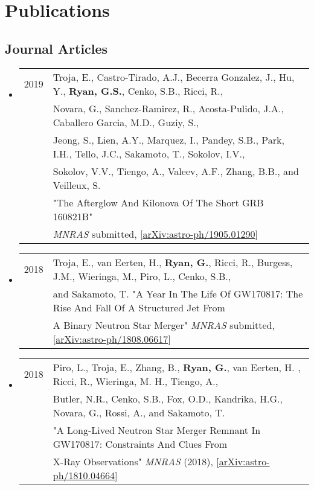 \section*{Publications}
\subsection*{Journal Articles}
\begin{itemize}

\item \begin{tabular}{ll}
2019 & {Troja}, E., {Castro-Tirado}, A.J.,  {Becerra Gonzalez}, J.,
         {Hu}, Y., {\bf {Ryan}, G.S.}, {Cenko}, S.B., {Ricci}, R., \\ &
         {Novara}, G., {Sanchez-Ramirez}, R., {Acosta-Pulido}, J.A.,
         {Caballero Garcia}, M.D., {Guziy}, S.,  \\ &
         {Jeong}, S.,
         {Lien}, A.Y., {Marquez}, I., {Pandey}, S.B., {Park}, I.H.,
         {Tello}, J.C., {Sakamoto}, T., {Sokolov}, I.V., \\ &
         {Sokolov}, V.V., {Tiengo}, A., {Valeev}, A.F.,
         {Zhang}, B.B., and {Veilleux}, S. \\ &"The Afterglow And Kilonova Of The Short GRB 160821B" \\ &
         \emph{MNRAS} submitted, [\href{https://arxiv.org/abs/1905.01290}{arXiv:astro-ph/1905.01290}]
\end{tabular}

\item \begin{tabular}{ll}
2018 & Troja, E., van Eerten, H., {\bf Ryan, G.}, Ricci, R., Burgess, J.M., Wieringa, M., Piro, L., Cenko, S.B.,\\
	& and Sakamoto, T. "A Year In The Life Of GW170817: The Rise And Fall Of A Structured Jet From\\
	&  A Binary Neutron Star Merger" \emph{MNRAS} submitted, [\href{https://arxiv.org/abs/1808.06617}{arXiv:astro-ph/1808.06617}]
\end{tabular}

\item \begin{tabular}{ll}
2018 &  Piro, L., Troja, E., Zhang, B., {\bf Ryan, G.}, van Eerten, H. , Ricci, R., Wieringa, M. H., Tiengo, A.,\\
	& Butler, N.R., Cenko, S.B., Fox, O.D., Kandrika, H.G., Novara, G., Rossi, A., and Sakamoto, T. \\
	& "A Long-Lived Neutron Star Merger Remnant In GW170817: Constraints And Clues From\\
	& X-Ray Observations" \emph{MNRAS} (2018), [\href{https://arxiv.org/abs/1810.04664}{arXiv:astro-ph/1810.04664}]
\end{tabular}


\end{itemize}
